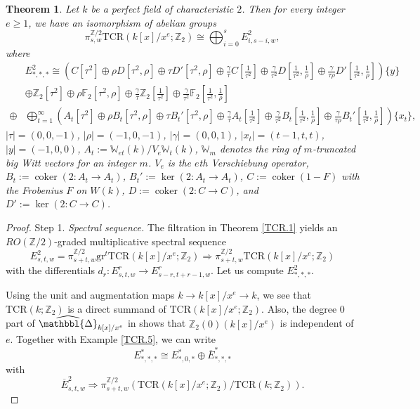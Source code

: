 \documentclass[10pt]{amsart}
\newtheorem{thm}{Theorem}[section]
\theoremstyle{definition}
\numberwithin{equation}{section}
\newcommand{\F}{\mathbb{F}}
\newcommand{\W}{\mathbb{W}}
\newcommand{\Z}{\mathbb{Z}}
\newcommand{\prism}{{\mathlarger{\mathbbl{\Delta}}}}
\DeclareMathOperator{\coker}{coker}
\newcommand{\gr}{\mathrm{gr}}
\newcommand{\TCR}{\mathrm{TCR}}
\begin{document}
{\begin{thm}
\label{TCR.6}
Let $k$ be a perfect field of characteristic $2$.
Then for every integer $e\geq 1$, we have an isomorphism of abelian groups
\[
\pi_{s,w}^{\Z/2}\TCR(k[x]/x^e;\Z_2) 
\cong
\bigoplus_{i=0}^s E_{i,s-i,w}^2,
\]
where
\begin{align*}
&E_{*,*,*}^2
\cong 
(C[\tau^2]
\oplus
\rho D[\tau^2,\rho]
\oplus
\tau D'[\tau^2,\rho]
\oplus
\tfrac{\gamma}{\tau} C[\tfrac{1}{\tau^2}]
\oplus
\tfrac{\gamma}{\tau^2}D [\tfrac{1}{\tau^2},\tfrac{1}{\rho}] \oplus \tfrac{\gamma}{\tau \rho} D'[\tfrac{1}{\tau^2},\tfrac{1}{\rho}])\{y\}
\\
&\oplus 
\Z_2[\tau^2] \oplus \rho \F_2[\tau^2,\rho]
\oplus
\tfrac{\gamma}{\tau} \Z_2[\tfrac{1}{\tau^2}] \oplus \tfrac{\gamma}{\tau^2}\F_2 [\tfrac{1}{\tau^2},\tfrac{1}{\rho}]
\\
\oplus
&
\bigoplus_{t=1}^\infty
(
A_t[\tau^2]
\oplus
\rho B_t[\tau^2,\rho]
\oplus
\tau B_t'[\tau^2,\rho]
\oplus
\tfrac{\gamma}{\tau} A_t[\tfrac{1}{\tau^2}]
\oplus
\tfrac{\gamma}{\tau^2}B_t [\tfrac{1}{\tau^2},\tfrac{1}{\rho}] \oplus \tfrac{\gamma}{\tau \rho} B_t'[\tfrac{1}{\tau^2},\tfrac{1}{\rho}]
)
\{x_t\},
\end{align*}
$\lvert \tau\rvert =(0,0,-1)$,
$\lvert \rho \rvert = (-1,0,-1)$,
$\lvert \gamma \rvert = (0,0,1)$,
$\lvert x_t\rvert = (t-1,t,t)$,
$\lvert y \rvert = (-1,0,0)$,
$A_t:=\W_{et}(k)/V_e\W_{t}(k)$, $\W_{m}$ denotes the ring of $m$-truncated big Witt vectors for an integer $m$.
$V_e$ is the $e$th Verschiebung operator,
$B_t:=\coker(2\colon A_t\to A_t)$,
$B_t':=\ker(2\colon A_t\to A_t)$,
$C:=\coker(1-F)$ with the Frobenius $F$ on $W(k)$,
$D:=\coker(2\colon C\to C)$,
and $D':=\ker(2\colon C\to C)$.
\end{thm}
\begin{proof}
Step 1. \emph{Spectral sequence.}
The filtration in Theorem \ref{TCR.1} yields an $RO(\Z/2)$-graded multiplicative spectral sequence
\[
E_{s,t,w}^2
=
\pi_{s+t,w}^{\Z/2}\gr^t \TCR(k[x]/x^e;\Z_2)
\Rightarrow
\pi_{s+t,w}^{\Z/2}\TCR(k[x]/x^e;\Z_2)
\]
with the differentials $d_r\colon E_{s,t,w}^r \to E_{s-r,t+r-1,w}^r$.
Let us compute $E_{*,*,*}^2$.


Using the unit and augmentation maps $k\to k[x]/x^e\to k$,
we see that $\TCR(k;\Z_2)$ is a direct summand of $\TCR(k[x]/x^e;\Z_2)$.
Also, the degree $0$ part of $\widehat{\prism}_{k[x]/x^e}$ in \cite[\S 3]{MR4632370} shows that $\Z_2(0)(k[x]/x^e)$ is independent of $e$.
Together with Example \ref{TCR.5},
we can write
\[
E_{*,*,*}^*
\cong
E_{*,0,*}^*
\oplus
\overline{E}_{*,*,*}^*
\]
with
\[
\overline{E}_{s,t,w}^2 \Rightarrow \pi_{s+t,w}^{\Z/2}(\TCR(k[x]/x^e;\Z_2)/\TCR(k;\Z_2)).
\]



\end{proof}}
\end{document}
